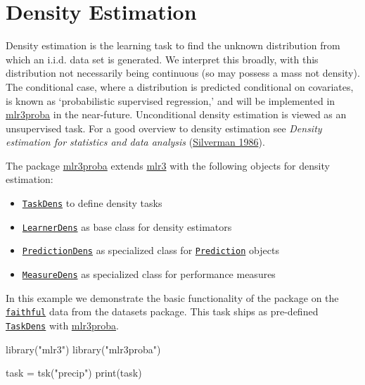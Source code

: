 \documentclass[
]{scrbook}
\newenvironment{Shaded}{\begin{snugshade}}{\end{snugshade}}
\newcommand{\FunctionTok}[1]{\textcolor[rgb]{0.00,0.00,0.00}{#1}}
\newcommand{\NormalTok}[1]{#1}
\newcommand{\OtherTok}[1]{\textcolor[rgb]{0.56,0.35,0.01}{#1}}
\newcommand{\StringTok}[1]{\textcolor[rgb]{0.31,0.60,0.02}{#1}}
\providecommand{\tightlist}{%
  \setlength{\itemsep}{0pt}\setlength{\parskip}{0pt}}
\renewenvironment{Shaded} {\begin{snugshade}\small} {\end{snugshade}}
\begin{document}
\hypertarget{density}{%
\section{Density Estimation}\label{density}}

Density estimation is the learning task to find the unknown distribution from which an i.i.d. data set is generated.
We interpret this broadly, with this distribution not necessarily being continuous (so may possess a mass not density).
The conditional case, where a distribution is predicted conditional on covariates, is known as `probabilistic supervised regression,' and will be implemented in \href{https://mlr3proba.mlr-org.com}{mlr3proba} in the near-future.
Unconditional density estimation is viewed as an unsupervised task.
For a good overview to density estimation see \emph{Density estimation for statistics and data analysis} (\protect\hyperlink{ref-Silverman1986}{Silverman 1986}).

The package \href{https://mlr3proba.mlr-org.com}{mlr3proba} extends \href{https://mlr3.mlr-org.com}{mlr3} with the following objects for density estimation:

\begin{itemize}
\tightlist
\item
  \href{https://mlr3proba.mlr-org.com/reference/TaskDens.html}{\texttt{TaskDens}} to define density tasks
\item
  \href{https://mlr3proba.mlr-org.com/reference/LearnerDens.html}{\texttt{LearnerDens}} as base class for density estimators
\item
  \href{https://mlr3proba.mlr-org.com/reference/PredictionDens.html}{\texttt{PredictionDens}} as specialized class for \href{https://mlr3.mlr-org.com/reference/Prediction.html}{\texttt{Prediction}} objects
\item
  \href{https://mlr3proba.mlr-org.com/reference/MeasureDens.html}{\texttt{MeasureDens}} as specialized class for performance measures
\end{itemize}

In this example we demonstrate the basic functionality of the package on the \href{https://www.rdocumentation.org/packages/datasets/topics/faithful}{\texttt{faithful}} data from the datasets package.
This task ships as pre-defined \href{https://mlr3proba.mlr-org.com/reference/TaskDens.html}{\texttt{TaskDens}} with \href{https://mlr3proba.mlr-org.com}{mlr3proba}.

\begin{Shaded}
\begin{Highlighting}[]
\FunctionTok{library}\NormalTok{(}\StringTok{"mlr3"}\NormalTok{)}
\FunctionTok{library}\NormalTok{(}\StringTok{"mlr3proba"}\NormalTok{)}

\NormalTok{task }\OtherTok{=} \FunctionTok{tsk}\NormalTok{(}\StringTok{"precip"}\NormalTok{)}
\FunctionTok{print}\NormalTok{(task)}
\end{Highlighting}
\end{Shaded}
\end{document}
